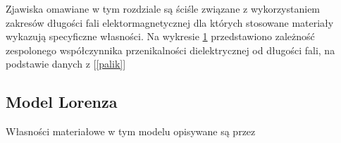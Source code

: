 Zjawiska omawiane w tym rozdziale są ściśle związane z wykorzystaniem zakresów długości fali elektormagnetycznej dla których stosowane materiały wykazują specyficzne własności. Na wykresie \ref{ag-permittivity} przedstawiono zależność zespolonego współczynnika przenikalności dielektrycznej od długości fali, na podstawie danych z [\ref{palik}]

\begin{figure}
\label{ag-permittivity}
\end{figure} 

\subsection{Model Lorenza}
Własności materiałowe w tym modelu opisywane są przez

